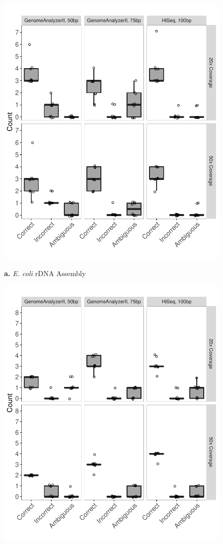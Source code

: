\documentclass[a4,center,fleqn]{NAR}
\begin{document}
\begin{figure}[!ht]
  \centering
  \begin{minipage}{.45\textwidth}
    \centering
    \includegraphics[width=.8\columnwidth]{coli}

    {\footnotesize \textbf{a.} \textit{E. coli} rDNA Assembly}
    \label{fig:sim_coli}
  \end{minipage}

  \begin{minipage}{.45\textwidth}
    \centering
    \includegraphics[width=.8\columnwidth]{kleb} %


\end{minipage}
\end{figure}
\end{document}
